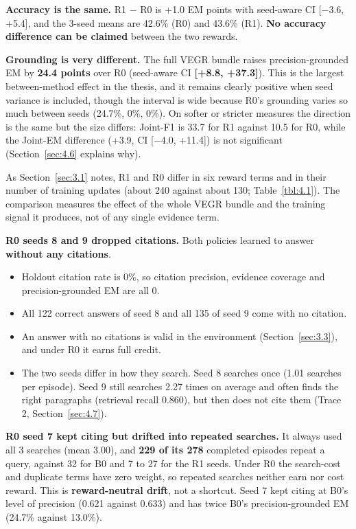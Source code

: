 \textbf{Accuracy is the same.} R1 − R0 is +1.0 EM points with seed-aware
CI {[}−3.6, +5.4{]}, and the 3-seed means are 42.6\% (R0) and 43.6\%
(R1). \textbf{No accuracy difference can be claimed} between the two
rewards.

\textbf{Grounding is very different.} The full VEGR bundle raises
precision-grounded EM by \textbf{24.4 points} over R0 (seed-aware CI
\textbf{{[}+8.8, +37.3{]}}). This is the largest between-method effect
in the thesis, and it remains clearly positive when seed variance is
included, though the interval is wide because R0's grounding varies so
much between seeds (24.7\%, 0\%, 0\%). On softer or stricter measures
the direction is the same but the size differs: Joint-F1 is 33.7 for R1
against 10.5 for R0, while the Joint-EM difference (+3.9, CI {[}−4.0,
+11.4{]}) is not significant (Section~\ref{sec:4.6} explains why).

As Section~\ref{sec:3.1} notes, R1 and R0 differ in six reward terms and
in their number of training updates (about 240 against about 130;
Table~\ref{tbl:4.1}). The comparison measures the effect of the whole
VEGR bundle and the training signal it produces, not of any single
evidence term.

\textbf{R0 seeds 8 and 9 dropped citations.} Both policies learned to
answer \textbf{without any citations}.

\begin{itemize}
\tightlist
\item
  Holdout citation rate is 0\%, so citation precision, evidence coverage
  and precision-grounded EM are all 0.
\item
  All 122 correct answers of seed 8 and all 135 of seed 9 come with no
  citation.
\item
  An answer with no citations is valid in the environment
  (Section~\ref{sec:3.3}), and under R0 it earns full credit.
\item
  The two seeds differ in how they search. Seed 8 searches once (1.01
  searches per episode). Seed 9 still searches 2.27 times on average and
  often finds the right paragraphs (retrieval recall 0.860), but then
  does not cite them (Trace 2, Section~\ref{sec:4.7}).
\end{itemize}

\textbf{R0 seed 7 kept citing but drifted into repeated searches.} It
always used all 3 searches (mean 3.00), and \textbf{229 of its 278}
completed episodes repeat a query, against 32 for B0 and 7 to 27 for the
R1 seeds. Under R0 the search-cost and duplicate terms have zero weight,
so repeated searches neither earn nor cost reward. This is
\textbf{reward-neutral drift}, not a shortcut. Seed 7 kept citing at
B0's level of precision (0.621 against 0.633) and has twice B0's
precision-grounded EM (24.7\% against 13.0\%).

